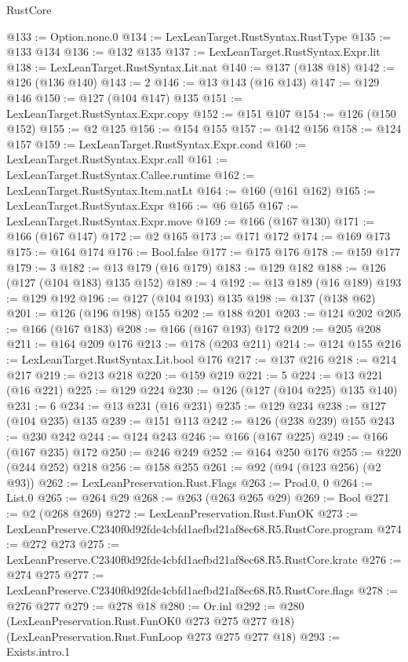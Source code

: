 \begin{lexlean}{RustCore}
\begin{coremodule}
@133 := Option.none.{0}
@134 := LexLeanTarget.RustSyntax.RustType
@135 := @133 @134
@136 := @132 @135
@137 := LexLeanTarget.RustSyntax.Expr.lit
@138 := LexLeanTarget.RustSyntax.Lit.nat
@140 := @137 (@138 @18)
@142 := @126 (@136 @140)
@143 := 2
@146 := @13 @143 (@16 @143)
@147 := @129 @146
@150 := @127 (@104 @147) @135
@151 := LexLeanTarget.RustSyntax.Expr.copy
@152 := @151 @107
@154 := @126 (@150 @152)
@155 := @2 @125
@156 := @154 @155
@157 := @142 @156
@158 := @124 @157
@159 := LexLeanTarget.RustSyntax.Expr.cond
@160 := LexLeanTarget.RustSyntax.Expr.call
@161 := LexLeanTarget.RustSyntax.Callee.runtime
@162 := LexLeanTarget.RustSyntax.Item.natLt
@164 := @160 (@161 @162)
@165 := LexLeanTarget.RustSyntax.Expr
@166 := @6 @165
@167 := LexLeanTarget.RustSyntax.Expr.move
@169 := @166 (@167 @130)
@171 := @166 (@167 @147)
@172 := @2 @165
@173 := @171 @172
@174 := @169 @173
@175 := @164 @174
@176 := Bool.false
@177 := @175 @176
@178 := @159 @177
@179 := 3
@182 := @13 @179 (@16 @179)
@183 := @129 @182
@188 := @126 (@127 (@104 @183) @135 @152)
@189 := 4
@192 := @13 @189 (@16 @189)
@193 := @129 @192
@196 := @127 (@104 @193) @135
@198 := @137 (@138 @62)
@201 := @126 (@196 @198) @155
@202 := @188 @201
@203 := @124 @202
@205 := @166 (@167 @183)
@208 := @166 (@167 @193) @172
@209 := @205 @208
@211 := @164 @209 @176
@213 := @178 (@203 @211)
@214 := @124 @155
@216 := LexLeanTarget.RustSyntax.Lit.bool @176
@217 := @137 @216
@218 := @214 @217
@219 := @213 @218
@220 := @159 @219
@221 := 5
@224 := @13 @221 (@16 @221)
@225 := @129 @224
@230 := @126 (@127 (@104 @225) @135 @140)
@231 := 6
@234 := @13 @231 (@16 @231)
@235 := @129 @234
@238 := @127 (@104 @235) @135
@239 := @151 @113
@242 := @126 (@238 @239) @155
@243 := @230 @242
@244 := @124 @243
@246 := @166 (@167 @225)
@249 := @166 (@167 @235) @172
@250 := @246 @249
@252 := @164 @250 @176
@255 := @220 (@244 @252) @218
@256 := @158 @255
@261 := @92 (@94 (@123 @256) (@2 @93))
@262 := LexLeanPreservation.Rust.Flags
@263 := Prod.{0, 0}
@264 := List.{0}
@265 := @264 @29
@268 := @263 (@263 @265 @29)
@269 := Bool
@271 := @2 (@268 @269)
@272 := LexLeanPreservation.Rust.FunOK
@273 := LexLeanPreserve.C2340f0d92fde4cbfd1aefbd21af8ec68.R5.RustCore.program
@274 := @272 @273
@275 := LexLeanPreserve.C2340f0d92fde4cbfd1aefbd21af8ec68.R5.RustCore.krate
@276 := @274 @275
@277 := LexLeanPreserve.C2340f0d92fde4cbfd1aefbd21af8ec68.R5.RustCore.flags
@278 := @276 @277
@279 := @278 @18
@280 := Or.inl
@292 := @280
    (LexLeanPreservation.Rust.FunOK0 @273 @275 @277 @18)
    (LexLeanPreservation.Rust.FunLoop @273 @275 @277 @18)
@293 := Exists.intro.{1}

\end{coremodule}
\end{lexlean}
